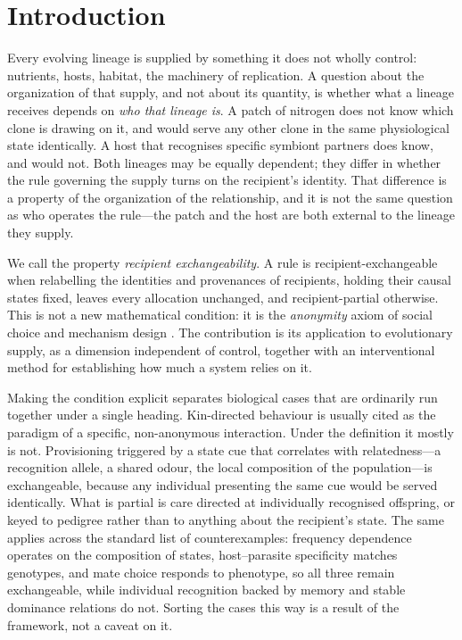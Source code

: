 \documentclass[review,3p,times]{elsarticle}
\begin{document}
\section{Introduction}

Every evolving lineage is supplied by something it does not wholly control:
nutrients, hosts, habitat, the machinery of replication. A question about the
organization of that supply, and not about its quantity, is whether what a
lineage receives depends on \emph{who that lineage is}. A patch of nitrogen
does not know which clone is drawing on it, and would serve any other clone in
the same physiological state identically. A host that recognises specific
symbiont partners does know, and would not. Both lineages may be equally
dependent; they differ in whether the rule governing the supply turns on the
recipient's identity. That difference is a property of the organization of the
relationship, and it is not the same question as who operates the rule---the
patch and the host are both external to the lineage they supply.

We call the property \emph{recipient exchangeability}. A rule is
recipient-exchangeable when relabelling the identities and provenances of
recipients, holding their causal states fixed, leaves every allocation
unchanged, and recipient-partial otherwise. This is not a new mathematical
condition: it is the \emph{anonymity} axiom of social choice and mechanism
design \citep{may1952,moulin2003}. The contribution is its application to
evolutionary supply, as a dimension independent of control, together with an
interventional method for establishing how much a system relies on it.

Making the condition explicit separates biological cases that are ordinarily
run together under a single heading. Kin-directed behaviour is usually cited
as the paradigm of a specific, non-anonymous interaction. Under the definition
it mostly is not. Provisioning triggered by a state cue that correlates with
relatedness---a recognition allele, a shared odour, the local composition of
the population---is exchangeable, because any individual presenting the same
cue would be served identically. What is partial is care directed at
individually recognised offspring, or keyed to pedigree rather than to
anything about the recipient's state. The same applies across the standard
list of counterexamples: frequency dependence operates on the composition of
states, host--parasite specificity matches genotypes, and mate choice responds
to phenotype, so all three remain exchangeable, while individual recognition
backed by memory and stable dominance relations do not. Sorting the cases this
way is a result of the framework, not a caveat on it.
\end{document}
